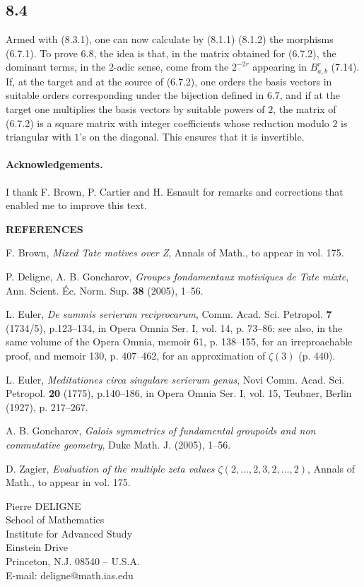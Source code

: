 \documentclass[10pt]{article}
\begin{document}
\subsection*{8.4}
Armed with (8.3.1), one can now calculate by (8.1.1) (8.1.2) the morphisms (6.7.1). To prove 6.8, the idea is that, in the matrix obtained for (6.7.2), the dominant terms, in the $2$-adic sense, come from the $2^{-2r}$ appearing in $B^r_{a,b}$ (7.14). If, at the target and at the source of (6.7.2), one orders the basis vectors in suitable orders corresponding under the bijection defined in 6.7, and if at the target one multiplies the basis vectors by suitable powers of $2$, the matrix of (6.7.2) is a square matrix with integer coefficients whose reduction modulo $2$ is triangular with $1$'s on the diagonal. This ensures that it is invertible.

\paragraph{Acknowledgements.}
I thank F. Brown, P. Cartier and H. Esnault for remarks and corrections that enabled me to improve this text.

\begin{center}\bfseries REFERENCES\end{center}
\begin{enumerate}[label={[\arabic*]},leftmargin=2.4em]
\item F. Brown, \emph{Mixed Tate motives over Z}, Annals of Math., to appear in vol. 175.
\item P. Deligne, A. B. Goncharov, \emph{Groupes fondamentaux motiviques de Tate mixte}, Ann. Scient. Éc. Norm. Sup. \textbf{38} (2005), 1--56.
\item L. Euler, \emph{De summis serierum reciprocarum}, Comm. Acad. Sci. Petropol. \textbf{7} (1734/5), p.123--134, in Opera Omnia Ser. I, vol. 14, p. 73--86; see also, in the same volume of the Opera Omnia, memoir 61, p. 138--155, for an irreproachable proof, and memoir 130, p. 407--462, for an approximation of $\zeta(3)$ (p. 440).
\item L. Euler, \emph{Meditationes circa singulare serierum genus}, Novi Comm. Acad. Sci. Petropol. \textbf{20} (1775), p.140--186, in Opera Omnia Ser. I, vol. 15, Teubner, Berlin (1927), p. 217--267.
\item A. B. Goncharov, \emph{Galois symmetries of fundamental groupoids and non commutative geometry}, Duke Math. J. (2005), 1--56.
\item D. Zagier, \emph{Evaluation of the multiple zeta values $\zeta(2,\ldots,2,3,2,\ldots,2)$}, Annals of Math., to appear in vol. 175.
\end{enumerate}

\begin{flushright}
Pierre DELIGNE\\
School of Mathematics\\
Institute for Advanced Study\\
Einstein Drive\\
Princeton, N.J. 08540 -- U.S.A.\\
E-mail: deligne@math.ias.edu
\end{flushright}
\end{document}
